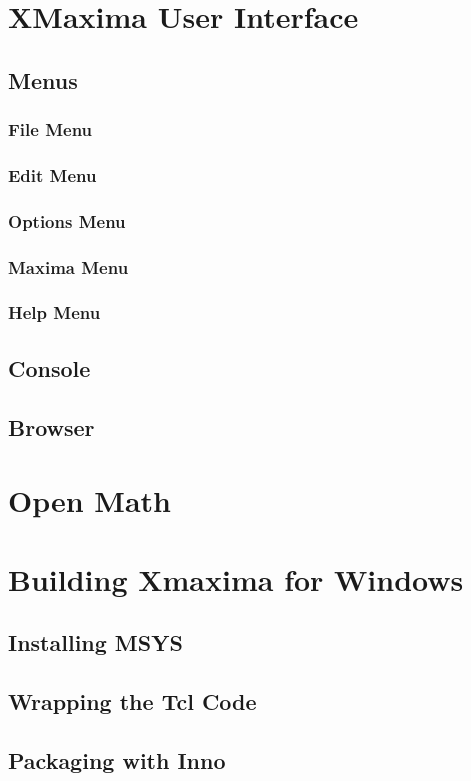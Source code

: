 \documentclass[12pt,makeidx,maxima]{report}
\begin{document}
\chapter{XMaxima User Interface}

\clearpage
\section{Menus}

\subsection{File Menu}

\subsection{Edit Menu}

\subsection{Options Menu}

\subsection{Maxima Menu}

\subsection{Help Menu}

\clearpage
\section{Console}

\clearpage
\section{Browser}

\clearpage
\chapter{Open Math}

\appendix
\clearpage
\chapter{Building Xmaxima for Windows}

\section{Installing MSYS}

\section{Wrapping the Tcl Code}

\section{Packaging with Inno}
\end{document}

